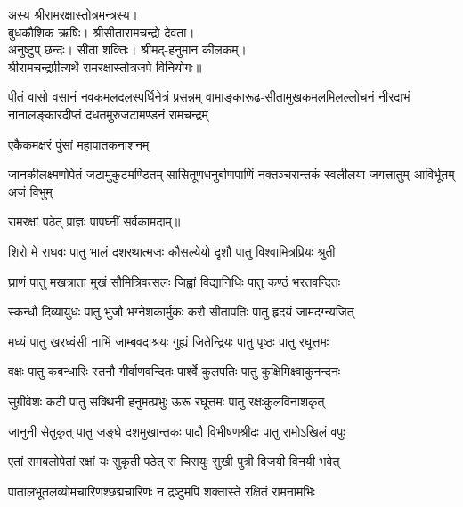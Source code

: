 
अस्य श्रीरामरक्षास्तोत्रमन्त्रस्य।\\
बुधकौशिक ऋषिः। श्रीसीतारामचन्द्रो देवता।\\
अनुष्टुप् छन्दः। सीता शक्तिः। श्रीमद्-हनुमान कीलकम्।\\
श्रीरामचन्द्रप्रीत्यर्थे रामरक्षास्तोत्रजपे विनियोगः॥

{पीतं वासो वसानं नवकमलदलस्पर्धिनेत्रं प्रसन्नम्}
{वामाङ्कारूढ-सीतामुखकमलमिलल्लोचनं नीरदाभं}
{नानालङ्कारदीप्तं दधतमुरुजटामण्डनं रामचन्द्रम्}

{एकैकमक्षरं पुंसां महापातकनाशनम्}

{जानकीलक्ष्मणोपेतं जटामुकुटमण्डितम्}
{सासितूणधनुर्बाणपाणिं नक्तञ्चरान्तकं}
{स्वलीलया जगत्त्रातुम् आविर्भूतम् अजं विभुम्}

{रामरक्षां पठेत् प्राज्ञः पापघ्नीं सर्वकामदाम्॥}

\resetShloka

\twolineshloka
{शिरो मे राघवः पातु भालं दशरथात्मजः}
{कौसल्येयो दृशौ पातु विश्वामित्रप्रियः श्रुती}

\twolineshloka
{घ्राणं पातु मखत्राता मुखं सौमित्रिवत्सलः}
{जिह्वां विद्यानिधिः पातु कण्ठं भरतवन्दितः}

\twolineshloka
{स्कन्धौ दिव्यायुधः पातु भुजौ भग्नेशकार्मुकः}
{करौ सीतापतिः पातु हृदयं जामदग्न्यजित्}

\twolineshloka
{मध्यं पातु खरध्वंसी नाभिं जाम्बवदाश्रयः}
{गुह्यं जितेन्द्रियः पातु पृष्ठः पातु रघूत्तमः}

\twolineshloka
{वक्षः पातु कबन्धारिः स्तनौ गीर्वाणवन्दितः}
{पार्श्वे कुलपतिः पातु कुक्षिमिक्ष्वाकुनन्दनः}

\twolineshloka
{सुग्रीवेशः कटी पातु सक्थिनी हनुमत्प्रभुः}
{ऊरू रघूत्तमः पातु रक्षःकुलविनाशकृत्}

\twolineshloka
{जानुनी सेतुकृत् पातु जङ्घे दशमुखान्तकः}
{पादौ विभीषणश्रीदः पातु रामोऽखिलं वपुः}

\twolineshloka
{एतां रामबलोपेतां रक्षां यः सुकृती पठेत्}
{स चिरायुः सुखी पुत्री विजयी विनयी भवेत्}

\twolineshloka
{पातालभूतलव्योमचारिणश्छद्मचारिणः}
{न द्रष्टुमपि शक्तास्ते रक्षितं रामनामभिः}

